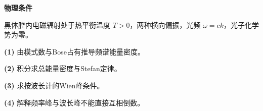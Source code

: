 \textbf{物理条件}\par 黑体腔内电磁辐射处于热平衡温度 \(T>0\)，两种横向偏振，光频 \(\omega=ck\)，光子化学势为零。
\par\noindent\textbf{(1)} 由模式数与Bose占有推导频谱能量密度。
\par\noindent\textbf{(2)} 积分求总能量密度与Stefan定律。
\par\noindent\textbf{(3)} 求按波长计的Wien峰条件。
\par\noindent\textbf{(4)} 解释频率峰与波长峰不能直接互相倒数。
